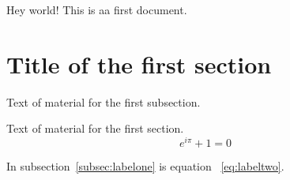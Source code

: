\documentclass{article}
\begin{document}
Hey world!
This is aa first document.

\section{Title of the first section}

Text of material for the first subsection.
\label{subsec:labelone}

Text of material for the first section.
\begin{equation}
    e^{i\pi}+1=0
\label{eq:labeltwo}
\end{equation}

In subsection~\ref{subsec:labelone} is equation ~\ref{eq:labeltwo}.
\end{document}
